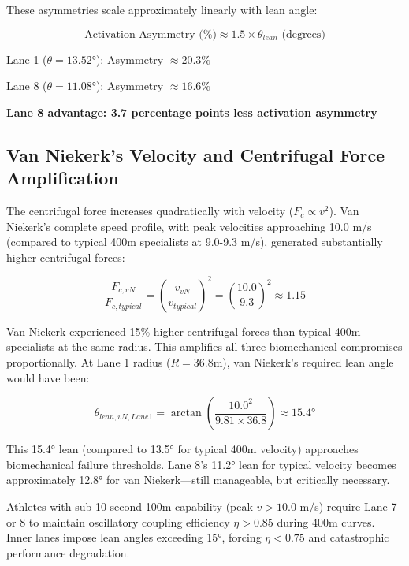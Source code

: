 These asymmetries scale approximately linearly with lean angle:

\begin{equation}
\text{Activation Asymmetry (\%)} \approx 1.5 \times \theta_{lean} \text{ (degrees)}
\end{equation}

Lane 1 ($\theta = 13.52°$): Asymmetry $\approx 20.3\%$

Lane 8 ($\theta = 11.08°$): Asymmetry $\approx 16.6\%$

\textbf{Lane 8 advantage: 3.7 percentage points less activation asymmetry}

\subsection{Van Niekerk's Velocity and Centrifugal Force Amplification}

The centrifugal force increases quadratically with velocity ($F_c \propto v^2$). Van Niekerk's complete speed profile, with peak velocities approaching 10.0 m/s (compared to typical 400m specialists at 9.0-9.3 m/s), generated substantially higher centrifugal forces:

\begin{equation}
\frac{F_{c,vN}}{F_{c,typical}} = \left(\frac{v_{vN}}{v_{typical}}\right)^2 = \left(\frac{10.0}{9.3}\right)^2 \approx 1.15
\end{equation}

Van Niekerk experienced 15\% higher centrifugal forces than typical 400m specialists at the same radius. This amplifies all three biomechanical compromises proportionally. At Lane 1 radius ($R = 36.8$m), van Niekerk's required lean angle would have been:

\begin{equation}
\theta_{lean,vN,Lane1} = \arctan\left(\frac{10.0^2}{9.81 \times 36.8}\right) \approx 15.4°
\end{equation}

This 15.4° lean (compared to 13.5° for typical 400m velocity) approaches biomechanical failure thresholds. Lane 8's 11.2° lean for typical velocity becomes approximately 12.8° for van Niekerk—still manageable, but critically necessary.

\begin{proposition}
Athletes with sub-10-second 100m capability (peak $v > 10.0$ m/s) require Lane 7 or 8 to maintain oscillatory coupling efficiency $\eta > 0.85$ during 400m curves. Inner lanes impose lean angles exceeding 15°, forcing $\eta < 0.75$ and catastrophic performance degradation.
\end{proposition}


